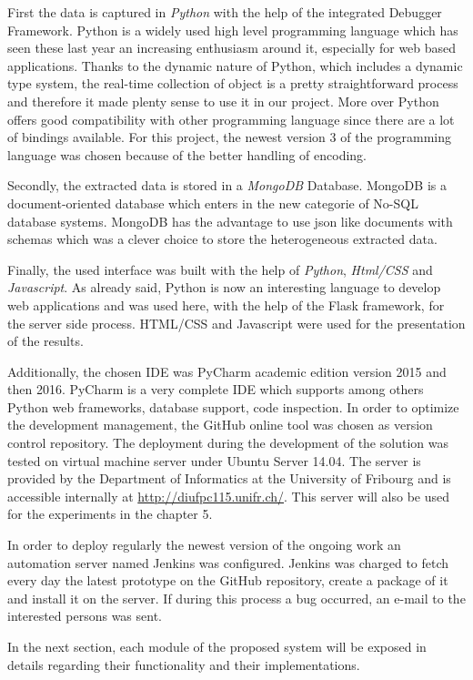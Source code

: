 First the data is captured in \textit{Python} with the help of the integrated Debugger Framework. Python is a widely used high level programming language which has seen these last year an increasing enthusiasm around it, especially for web based applications. Thanks to the dynamic nature of Python, which includes a dynamic type system, the real-time collection of object is a pretty straightforward process and therefore it made plenty sense to use it in our project. More over Python offers good compatibility with other programming language since there are a lot of bindings available. For this project, the newest version 3 of the programming language was chosen because of the better handling of encoding.

Secondly, the extracted data is stored in a \textit{MongoDB} Database. MongoDB is a document-oriented database which enters in the new categorie of No-SQL database systems. MongoDB has the advantage to use \gls{json} like documents with schemas which was a clever choice to store the heterogeneous extracted data.

Finally, the used interface was built with the help of \textit{Python}, \textit{Html/CSS} and \textit{Javascript}. As already said, Python is now an interesting language to develop web applications and was used here, with the help of the Flask framework, for the server side process. HTML/CSS and Javascript were used for the presentation of the results.

Additionally, the chosen IDE was PyCharm academic edition version 2015 and then 2016. PyCharm is a very complete IDE which supports among others Python web frameworks, database support, code inspection. In order to optimize the development management, the GitHub online tool was chosen as version control repository. The deployment during the development of the solution was tested on virtual machine server under Ubuntu Server 14.04. The server is provided by the Department of Informatics at the University of Fribourg and is accessible internally at \url{http://diufpc115.unifr.ch/}. This server will also be used for the experiments in the chapter 5. 

In order to deploy regularly the newest version of the ongoing work an automation server named Jenkins was configured. Jenkins was charged to fetch every day the latest prototype on the GitHub repository, create a package of it and install it on the server. If during this process a bug occurred, an e-mail to the interested persons was sent.

In the next section, each module of the proposed system will be exposed in details regarding their functionality and their implementations.

